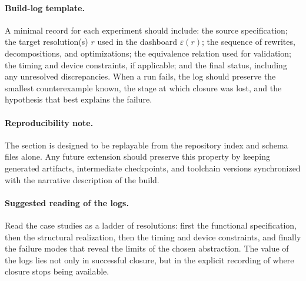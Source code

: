 \documentclass[11pt]{article}
\begin{document}
\paragraph{Build-log template.} A minimal record for each experiment should include: the source specification; the target resolution(s) \(r\) used in the dashboard \(\varepsilon(r)\); the sequence of rewrites, decompositions, and optimizations; the equivalence relation used for validation; the timing and device constraints, if applicable; and the final status, including any unresolved discrepancies. When a run fails, the log should preserve the smallest counterexample known, the stage at which closure was lost, and the hypothesis that best explains the failure.

\paragraph{Reproducibility note.} The section is designed to be replayable from the repository index and schema files alone. Any future extension should preserve this property by keeping generated artifacts, intermediate checkpoints, and toolchain versions synchronized with the narrative description of the build.

\paragraph{Suggested reading of the logs.} Read the case studies as a ladder of resolutions: first the functional specification, then the structural realization, then the timing and device constraints, and finally the failure modes that reveal the limits of the chosen abstraction. The value of the logs lies not only in successful closure, but in the explicit recording of where closure stops being available.
\end{document}
